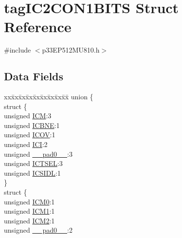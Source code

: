 \hypertarget{structtag_i_c2_c_o_n1_b_i_t_s}{}\section{tag\+I\+C2\+C\+O\+N1\+B\+I\+TS Struct Reference}
\label{structtag_i_c2_c_o_n1_b_i_t_s}


{\ttfamily \#include $<$p33\+E\+P512\+M\+U810.\+h$>$}

\subsection*{Data Fields}
\begin{DoxyCompactItemize}
\item 
\begin{tabbing}
xx\=xx\=xx\=xx\=xx\=xx\=xx\=xx\=xx\=\kill
union \{\\
\>struct \{\\
\>\>unsigned \hyperlink{structtag_i_c2_c_o_n1_b_i_t_s_ad3edde44ecb2d349ffa2decd0a251c20}{ICM}:3\\
\>\>unsigned \hyperlink{structtag_i_c2_c_o_n1_b_i_t_s_a824e7dcca83939e1b049d63ffcee33e9}{ICBNE}:1\\
\>\>unsigned \hyperlink{structtag_i_c2_c_o_n1_b_i_t_s_a49392949376ba0bf58cf8db889e86c94}{ICOV}:1\\
\>\>unsigned \hyperlink{structtag_i_c2_c_o_n1_b_i_t_s_a72486dcb868aad2d5c978494691356cc}{ICI}:2\\
\>\>unsigned \hyperlink{structtag_i_c2_c_o_n1_b_i_t_s_adf71f3d8410c1f1dbbc96680a92c49af}{\_\_pad0\_\_}:3\\
\>\>unsigned \hyperlink{structtag_i_c2_c_o_n1_b_i_t_s_a7a9dd41b5f93eb620df7fa336e452677}{ICTSEL}:3\\
\>\>unsigned \hyperlink{structtag_i_c2_c_o_n1_b_i_t_s_af441b36127c0bb7a35162dfc9a64103c}{ICSIDL}:1\\
\>\} \\
\>struct \{\\
\>\>unsigned \hyperlink{structtag_i_c2_c_o_n1_b_i_t_s_a649b1dd9bca75e558f37a9f52a829bd4}{ICM0}:1\\
\>\>unsigned \hyperlink{structtag_i_c2_c_o_n1_b_i_t_s_af3fe77ef9f8ca41ff11519f445e7bc77}{ICM1}:1\\
\>\>unsigned \hyperlink{structtag_i_c2_c_o_n1_b_i_t_s_a3c62c9cbbc3a406402126c932b709db8}{ICM2}:1\\
\>\>unsigned \hyperlink{structtag_i_c2_c_o_n1_b_i_t_s_adf71f3d8410c1f1dbbc96680a92c49af}{\_\_pad0\_\_}:2\\

\end{tabbing}
\end{DoxyCompactItemize}
